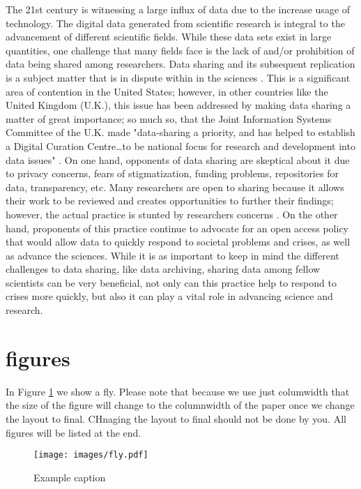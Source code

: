 \documentclass[sigconf]{acmart}
\begin{document}
The 21st century is witnessing a large influx of data due to the increase usage of technology. The digital data generated from scientific research is integral to the advancement of different scientific fields. While these data sets exist in large quantities, one challenge that many fields face is the lack of and/or prohibition of data being shared among researchers. Data sharing and its subsequent replication is a subject matter that is in dispute within in the sciences \cite{leetaru2016}. This is a significant area of contention in the United States; however, in other countries like the United Kingdom (U.K.), this issue has been addressed by making data sharing a matter of great importance; so much so, that the Joint Information Systems Committee of the U.K. made "data-sharing a priority, and has helped to establish a Digital Curation Centre…to be national focus for research and development into data issues" \cite{pryor2009skilling}. On one hand, opponents of data sharing are skeptical about it due to privacy concerns, fears of stigmatization, funding problems, repositories for data, transparency, etc.  Many researchers are open to sharing because it allows their work to be reviewed and creates opportunities to further their findings; however, the actual practice is stunted by researchers concerns \cite{nelson2009empty}. On the other hand, proponents of this practice continue to advocate for an open access policy that would allow data to quickly respond to societal problems and crises, as well as advance the sciences. While it is as important to keep in mind the different challenges to data sharing, like data archiving, sharing data among fellow scientists can be very beneficial, not only can this practice help to respond to crises more quickly, but also it can play a vital role in advancing science and research.

\section{figures}

In Figure \ref{f:fly} we show a fly. Please note that because we use
just columwidth that the size of the figure will change to the
columnwidth of the paper once we change the layout to final. CHnaging
the layout to final should not be done by you. All figures will be
listed at the end.

\begin{figure}[!ht]
  \centering\texttt{[image: images/fly.pdf]}
  \caption{Example caption}\label{f:fly}
\end{figure}
\end{document}
